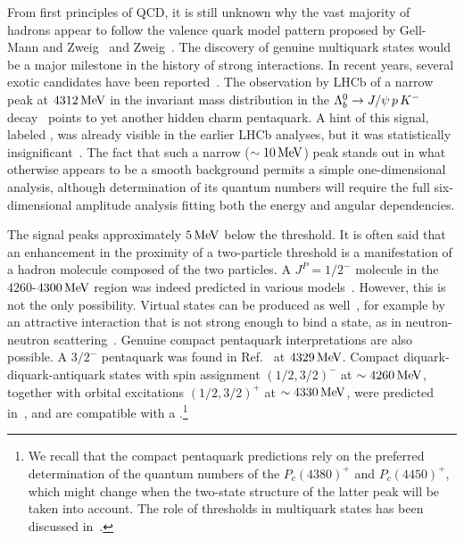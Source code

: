 \documentclass[aps,prl,
twocolumn,nofootinbib,
superscriptaddress,preprintnumbers]{revtex4-1}
\begin{document}
\maketitle
   From first principles of QCD, it is still unknown why the vast majority of hadrons  appear to follow the valence quark model pattern proposed by Gell-Mann and Zweig~\cite{GellMann:1964nj}
   and Zweig~\cite{Zweig:1981pd}. The discovery of genuine multiquark states would be 
    a major milestone in the history of strong interactions. In recent years, several exotic candidates have been reported~\cite{Esposito:2016noz,Lebed:2016hpi,Guo:2017jvc,Olsen:2017bmm,Karliner:2017qhf,ali2019multiquark}. 
The observation by LHCb of a narrow peak at $4312{\mathrm{\,Me\kern -0.1em V}}$ in the \jpsip  invariant mass distribution in the  $\Lambda_b^0 \to J/\psi\,p\, K^-$ decay~\cite{Aaij:2019vzc} points to 
  yet another hidden charm  pentaquark. 
  A hint of this signal, labeled \Pc, was already visible in the earlier LHCb analyses, but it was statistically insignificant~\cite{Aaij:2015tga,Aaij:2016phn}. 
  The fact that such a narrow ($\sim 10{\mathrm{\,Me\kern -0.1em V}}$) peak stands out in 
  what otherwise  appears to be a smooth background permits 
 a simple one-dimensional analysis, although determination of its quantum numbers will require the full six-dimensional 
amplitude analysis fitting both the energy and angular dependencies. 
    
The signal peaks approximately $5{\mathrm{\,Me\kern -0.1em V}}$ below the \SigmaD threshold.
 It is often said that an enhancement in the proximity of a two-particle threshold is a manifestation of a hadron molecule composed of the two particles. A $J^P = 1/2^-$ \SigmaD molecule in the $4260$-$4300{\mathrm{\,Me\kern -0.1em V}}$ region was indeed predicted in various 
 models~\cite{Wu:2010jy,Wu:2010vk,Wang:2011rga,Yang:2011wz,Xiao:2013yca,Yamaguchi:2017zmn}.
   However, this is not the only possibility. 
   Virtual states can be produced as well~\cite{Eden:1964zz}, for example by an attractive interaction that is not strong enough to bind a state,  as in neutron-neutron scattering~\cite{Hammer:2014rba}.
 Genuine compact pentaquark interpretations are also possible. A $3/2^-$ pentaquark was found in Ref.~\cite{Zhu:2015bba} at $4329{\mathrm{\,Me\kern -0.1em V}}$. Compact diquark-diquark-antiquark states with  
       spin assignment $(1/2,3/2)^-$ at 
       $\sim4260{\mathrm{\,Me\kern -0.1em V}}$, together with orbital excitations $(1/2,3/2)^+$  at $\sim4330{\mathrm{\,Me\kern -0.1em V}}$,  were predicted in~\cite{Maiani:2015vwa}, and are compatible with a \Pc.\footnote{We recall that the compact pentaquark predictions rely on the preferred determination of the quantum numbers of the  $P_c(4380)^+$ and $P_c(4450)^+$, which might change when the two-state structure of the latter peak will be taken into account. The role of thresholds in multiquark states has been discussed in~\cite{Blitz:2015nra,Esposito:2016itg}. } 
\end{document}

